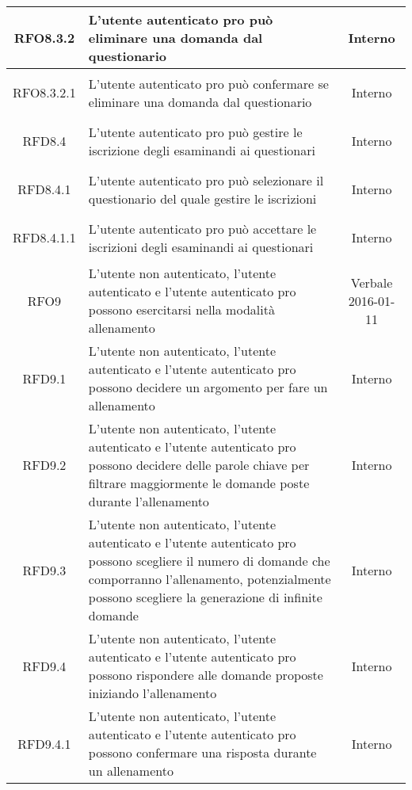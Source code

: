 \begin{longtable}{|c|>{\centering}m{7cm}|c|}
\hypertarget{RFO8.3.2}{RFO8.3.2} & L’utente autenticato pro può eliminare una domanda dal questionario & Interno
\\ \hline

\hypertarget{RFO8.3.2.1}{RFO8.3.2.1} & L’utente autenticato pro può confermare se eliminare una domanda dal questionario & Interno
\\ \hline

\hypertarget{RFD8.4}{RFD8.4} & L’utente autenticato pro può gestire le iscrizione degli esaminandi ai questionari & Interno
\\ \hline

\hypertarget{RFD8.4.1}{RFD8.4.1} & L’utente autenticato pro può selezionare il questionario del quale gestire le iscrizioni & Interno
\\ \hline

\hypertarget{RFD8.4.1.1}{RFD8.4.1.1} & L’utente autenticato pro può accettare le iscrizioni degli esaminandi ai questionari & Interno
\\ \hline

\hypertarget{RFO9}{RFO9} & L’utente non autenticato, l’utente autenticato e l’utente autenticato pro possono esercitarsi nella modalità allenamento & Verbale 2016-01-11
\\ \hline

\hypertarget{RFD9.1}{RFD9.1} & L'utente non autenticato, l'utente autenticato e l'utente autenticato pro possono decidere un argomento per fare un allenamento & Interno
\\ \hline

\hypertarget{RFD9.2}{RFD9.2} & L'utente non autenticato, l'utente autenticato e l'utente autenticato pro possono decidere delle parole chiave per filtrare maggiormente le domande poste durante l'allenamento & Interno
\\ \hline

\hypertarget{RFD9.3}{RFD9.3} & L'utente non autenticato, l'utente autenticato e l'utente autenticato pro possono scegliere il numero di domande che comporranno l'allenamento, potenzialmente possono scegliere la generazione di infinite domande & Interno
\\ \hline

\hypertarget{RFD9.4}{RFD9.4} & L'utente non autenticato, l'utente autenticato e l'utente autenticato pro possono rispondere alle domande proposte iniziando l'allenamento & Interno
\\ \hline

\hypertarget{RFD9.4.1}{RFD9.4.1} & L'utente non autenticato, l'utente autenticato e l'utente autenticato pro possono confermare una risposta durante un allenamento & Interno
\\ \hline


\end{longtable}
